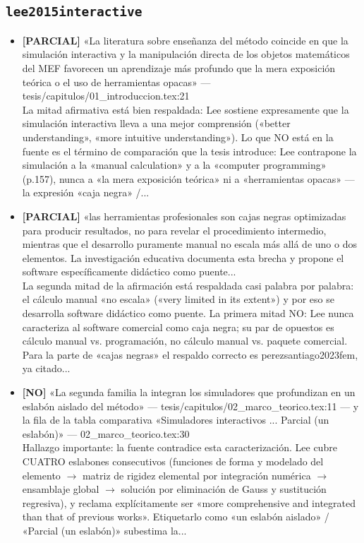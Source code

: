 \documentclass[11pt,a4paper]{article}
\newcommand{\campo}[1]{\textcolor{gris}{\footnotesize #1}}
\begin{document}
\subsection{\texttt{lee2015interactive}}
\begin{itemize}\small
\item \textbf{[PARCIAL]} «La literatura sobre enseñanza del método coincide en que la simulación interactiva y la manipulación directa de los objetos matemáticos del MEF favorecen un aprendizaje más profundo que la mera exposición teórica o el uso de herramientas opacas» --- tesis/capitulos/01\_introduccion.tex:21
\\ \campo{La mitad afirmativa está bien respaldada: Lee sostiene expresamente que la simulación interactiva lleva a una mejor comprensión («better understanding», «more intuitive understanding»). Lo que NO está en la fuente es el término de comparación que la tesis introduce: Lee contrapone la simulación a la «manual calculation» y a la «computer programming» (p.157), nunca a «la mera exposición teórica» ni a «herramientas opacas» --- la expresión «caja negra» /...}
\item \textbf{[PARCIAL]} «las herramientas profesionales son cajas negras optimizadas para producir resultados, no para revelar el procedimiento intermedio, mientras que el desarrollo puramente manual no escala más allá de uno o dos elementos. La investigación educativa documenta esta brecha y propone el software específicamente didáctico como puente...
\\ \campo{La segunda mitad de la afirmación está respaldada casi palabra por palabra: el cálculo manual «no escala» («very limited in its extent») y por eso se desarrolla software didáctico como puente. La primera mitad NO: Lee nunca caracteriza al software comercial como caja negra; su par de opuestos es cálculo manual vs. programación, no cálculo manual vs. paquete comercial. Para la parte de «cajas negras» el respaldo correcto es perezsantiago2023fem, ya citado...}
\item \textbf{[NO]} «La segunda familia la integran los simuladores que profundizan en un eslabón aislado del método» --- tesis/capitulos/02\_marco\_teorico.tex:11 --- y la fila de la tabla comparativa «Simuladores interactivos ... Parcial (un eslabón)» --- 02\_marco\_teorico.tex:30
\\ \campo{Hallazgo importante: la fuente contradice esta caracterización. Lee cubre CUATRO eslabones consecutivos (funciones de forma y modelado del elemento $\rightarrow$ matriz de rigidez elemental por integración numérica $\rightarrow$ ensamblaje global $\rightarrow$ solución por eliminación de Gauss y sustitución regresiva), y reclama explícitamente ser «more comprehensive and integrated than that of previous works». Etiquetarlo como «un eslabón aislado» / «Parcial (un eslabón)» subestima la...}

\end{itemize}
\end{document}
